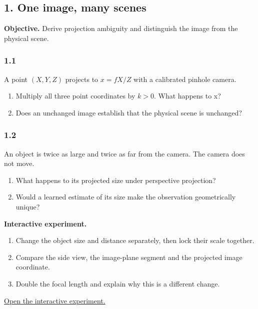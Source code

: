 \documentclass[11pt,a4paper]{article}
\begin{document}
\subsection*{1. One image, many scenes}
\noindent\textbf{Objective.} Derive projection ambiguity and distinguish the image from the physical scene.
\par
\noindent
\begin{minipage}{\linewidth}
\subsubsection*{1.1}
A point $(X,Y,Z)$ projects to $x=fX/Z$ with a calibrated pinhole camera.
\begin{enumerate}[label=(\alph*),nosep]
\item Multiply all three point coordinates by $k>0$.
What happens to x?
\item Does an unchanged image establish that the physical scene is unchanged?
\end{enumerate}
\end{minipage}
\par\medskip
\par
\noindent
\begin{minipage}{\linewidth}
\subsubsection*{1.2}
An object is twice as large and twice as far from the camera.
The camera does not move.
\begin{enumerate}[label=(\alph*),nosep]
\item What happens to its projected size under perspective projection?
\item Would a learned estimate of its size make the observation geometrically unique?
\end{enumerate}
\end{minipage}
\par\medskip
\noindent\textbf{Interactive experiment.}
\begin{enumerate}[nosep]
\item Change the object size and distance separately, then lock their scale together.
\item Compare the side view, the image-plane segment and the projected image coordinate.
\item Double the focal length and explain why this is a different change.
\end{enumerate}
\noindent\href{https://sosekie.github.io/Unibe-CVG-CV-Interactive-Labs/tutorial-10/#ambiguity}{Open the interactive experiment.}
\end{document}
